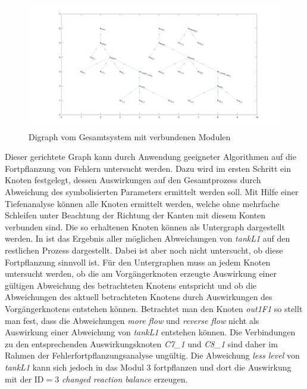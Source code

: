 \begin{figure}[h!tb]
\centering
\includegraphics[width=\textwidth]{bilder/04_code_Sys2.png}
\caption[Digraph gekoppeltes Gesamtsystems]{Digraph vom Gesamtsystem mit verbundenen Modulen}
\label{fig:graph_sysGesVerb}
\end{figure}

Dieser gerichtete Graph kann durch Anwendung geeigneter Algorithmen auf die Fortpflanzung von Fehlern untersucht werden. Dazu wird im ersten Schritt ein Knoten festgelegt, dessen Auswirkungen auf den Gesamtprozess durch Abweichung des symbolisierten Parameters ermittelt werden soll. Mit Hilfe einer Tiefenanalyse k\"onnen alle Knoten ermittelt werden, welche ohne mehrfache Schleifen unter Beachtung der Richtung der Kanten mit diesem Konten verbunden sind. Die so erhaltenen Knoten k\"onnen als Untergraph dargestellt werden. In  ist das Ergebnis aller m\"oglichen Abweichungen von \textit{tankL1} auf den restlichen Prozess dargestellt. Dabei ist aber noch nicht untersucht, ob diese Fortpflanzung sinnvoll ist. F\"ur den Untergraphen muss an jedem Knoten untersucht werden, ob die am Vorg\"angerknoten erzeugte Auswirkung einer g\"ultigen Abweichung des betrachteten Knotens entspricht und ob die Abweichungen des aktuell betrachteten Knotens durch Auswirkungen des Vorg\"angerknotens entstehen k\"onnen. Betrachtet man den Knoten \textit{out1F1} so stellt man fest, dass die Abweichungen \textit{more flow} und \textit{reverse flow} nicht als Auswirkung einer Abweichung von \textit{tankL1} entstehen k\"onnen. Die Verbindungen zu den entsprechenden Auswirkungsknoten \textit{C7{\_}1} und \textit{C8{\_}1} sind daher im Rahmen der Fehlerfortpflanzungsanalyse ung\"ultig. Die Abweichung \textit{less level} von \textit{tankL1} kann sich jedoch in das Modul 3 fortpflanzen und dort die Auswirkung mit der $\text{ID} = 3$ \textit{changed reaction balance} erzeugen. 

